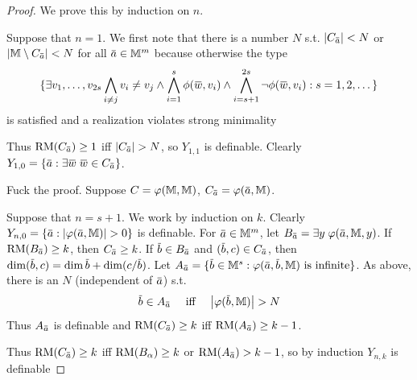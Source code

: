 \documentclass[11pt]{article}
\begin{document}
\begin{proof}
We prove this by induction on \(n\).

Suppose that \(n=1\). We first note that there is a number \(N\) s.t. \(\abs{C_{\bara}}<N\)
or \(\abs{\M\setminus C_{\bara}}<N\) for all \(\bara\in\M^m\)  because otherwise the type
\begin{equation*}
\{\exists v_1,\dots,v_{2s}\bigwedge_{i\neq j}v_i\neq v_j\wedge\bigwedge_{i=1}^s\phi(\barw,v_i)\wedge\bigwedge_{i=s+1}^{2s}\neg\phi(\barw,v_i):s=1,2,\dots\}
\end{equation*}
is satisfied and a realization violates strong minimality

Thus \(\RM(C_{\bara})\ge 1\) iff \(\abs{C_{\bara}}>N\), so \(Y_{1,1}\) is definable.
Clearly \(Y_{1,0}=\{\bara:\exists\barw\;\barw\in C_{\bara}\}\).

Fuck the proof. Suppose \(C=\varphi(\mathbb{M},\mathbb{M})\), \(C_{\bara}=\varphi(\bara,\M)\).

Suppose that \(n=s+1\). We work by induction on \(k\).
Clearly \(Y_{n,0}=\{\bara:\abs{\varphi(\bara,\M)}>0\}\) is definable. For \(\bara\in\M^m\),
let \(B_{\bara}=\exists y\;\varphi(\bara,\M,y)\). If \(\RM(B_{\bara})\ge k\), then \(C_{\bara}\ge k\).
If \(\barb\in B_{\bara}\) and \((\barb,c)\in C_{\bara}\),
then \(\dim(\barb,c)=\dim\barb+\dim(c/\barb)\).
Let \(A_{\bara}=\{\barb\in\M^s:\varphi(\bara,\barb,\M)\text{ is infinite}\}\). As above, there is an \(N\) (independent of \(\bara\)) s.t.
\begin{equation*}
\barb\in A_{\bara} \quad\text{ iff }\quad\abs{\varphi(\barb,\M)}>N
\end{equation*}
Thus \(A_{\bara}\) is definable and \(\RM(C_{\bara})\ge k\) iff \(\RM(A_{\bara})\ge k-1\).

Thus \(\RM(C_{\bara})\ge k\) iff \(\operatorname{RM}(B_{\alpha})\ge k\) or \(\RM(A_{\bara})>k-1\), so by
induction \(Y_{n,k}\) is definable


\end{proof}
\end{document}
